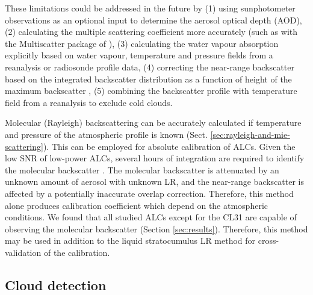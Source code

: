 These limitations could be addressed in the future by (1) using sunphotometer
observations as an optional input to determine the aerosol optical depth (AOD),
(2) calculating the multiple
scattering coefficient more accurately (such as with the Multiscatter package of
\cite{hogan2006}), (3) calculating the water vapour absorption explicitly based
on water vapour, temperature and pressure fields from a reanalysis or
radiosonde profile data, (4) correcting the near-range backscatter based on
the integrated backscatter distribution as a function of height of the maximum backscatter \citep[Sect. 5.1]{hopkin2019}, (5)
combining the backscatter profile with temperature field from a reanalysis
to exclude cold clouds.

Molecular (Rayleigh) backscattering can be accurately calculated if temperature
and pressure of the atmospheric profile is known (Sect. \ref{sec:rayleigh-and-mie-scattering}). This can be employed for absolute
calibration of ALCs. Given the low SNR of low-power ALCs,
several hours of integration are required to identify the molecular
backscatter \citep{wiegner2014}. The molecular backscatter is attenuated by an unknown
amount of aerosol with unknown LR, and the near-range backscatter
is affected by a potentially inaccurate overlap correction. Therefore, this
method alone produces calibration coefficient which depend on the atmospheric
conditions. We found that all studied ALCs except for the CL31 are capable
of observing the molecular backscatter (Section \ref{sec:results}).
Therefore, this method may be used in addition to the liquid stratocumulus
LR method for cross-validation of the calibration.

\subsection{Cloud detection}
\label{sec:cloud-detection}

